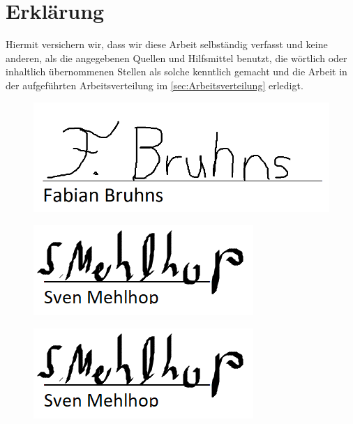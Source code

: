 \section{Erklärung}

Hiermit versichern wir, dass wir diese Arbeit selbständig verfasst und keine anderen, als die angegebenen Quellen und Hilfsmittel benutzt, die wörtlich oder inhaltlich übernommenen Stellen als solche kenntlich gemacht und die Arbeit in der aufgeführten Arbeitsverteilung im \autoref{sec:Arbeitsverteilung} erledigt. \\[2ex] 

\noindent
\begin{minipage}{0.4\textwidth}
	\begin{figure}[H]
			\includegraphics[scale=0.4]{Anhang/UnterschriftFabian.png}
	\end{figure}
\end{minipage}
\begin{minipage}{0.4\textwidth}
	\begin{figure}[H]
		\includegraphics{Anhang/Unterschriften.png}%
	\end{figure}
\end{minipage}
\begin{minipage}{0.4\textwidth}
	\begin{figure}[H]
		\includegraphics{Anhang/Unterschriften.png}
	\end{figure}
\end{minipage}

